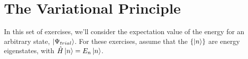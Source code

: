 %
%
%
%

\section*{The Variational Principle}

	In this set of exercises, we'll consider the expectation value of the energy for an arbitrary state, $\ket{\Psi_{trial}}$.  For these exercises, assume that the $\{\ket{n}\}$ are energy eigenstates, with $\hat H \ket{n} = E_n \ket{n}$.
	
